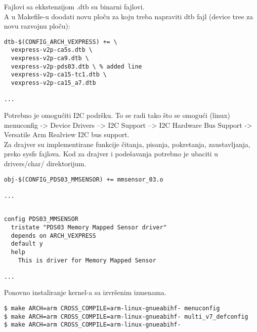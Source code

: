 \documentclass{article}
\begin{document}
Fajlovi sa ekkstenzijom .dtb  su binarni fajlovi. \\

A u Makefile-u doodati novu ploču za koju treba napraviti dtb fajl (device tree za novu razvojnu ploču):

\begin{file}
\begin{verbatim}
dtb-$(CONFIG_ARCH_VEXPRESS) += \
  vexpress-v2p-ca5s.dtb \
  vexpress-v2p-ca9.dtb \
  vexpress-v2p-pds03.dtb \ % added line
  vexpress-v2p-ca15-tc1.dtb \
  vexpress-v2p-ca15_a7.dtb

...
\end{verbatim}
\end{file}


Potrebno je omogućiti I2C podršku. To se radi tako što se omogući (linux) menuconfig -> Device Drivers –> I2C Support –> I2C Hardware Bus Support -> Versatile Arm Realview I2C bus support. \\

Za drajver su implementirane funkcije čitanja, pisanja, pokretanja, zaustavljanja, preko sysfs fajlova. Kod za drajver i podešavanja potrebno je ubaciti u drivers/char/ direktorijum. \\



\begin{file}[./linux-*/drivers/char/Makefile]
\begin{verbatim}
obj-$(CONFIG_PDS03_MMSENSOR) += mmsensor_03.o

...
\end{verbatim}
\end{file}


\begin{file}
\begin{verbatim}

config PDS03_MMSENSOR
  tristate "PDS03 Memory Mapped Sensor driver"
  depends on ARCH_VEXPRESS
  default y
  help
    This is driver for Memory Mapped Sensor

...
\end{verbatim}
\end{file}

Ponovno instaliranje kernel-a sa izvršenim izmenama. 

\begin{commandline}
  \begin{verbatim}
$ make ARCH=arm CROSS_COMPILE=arm-linux-gnueabihf- menuconfig
$ make ARCH=arm CROSS_COMPILE=arm-linux-gnueabihf- multi_v7_defconfig
$ make ARCH=arm CROSS_COMPILE=arm-linux-gnueabihf-
  \end{verbatim}
\end{commandline}
\end{document}
